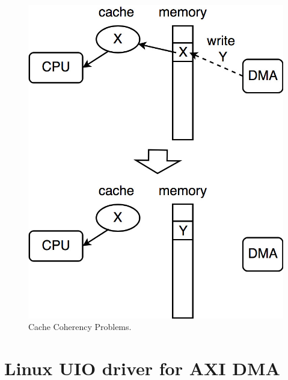 \begin{figure}[!htb]
  \centering
  \includegraphics[scale=0.2]{images/cache_coherency.jpg}
  \caption[Cache Coherency Problems.]{Cache Coherency Problems.}
  \label{fig:Cache Coherency Problems.}
\end{figure}
\section{Linux UIO driver for AXI DMA}
\label{sec:Linux UIO driver for AXI DMA}





